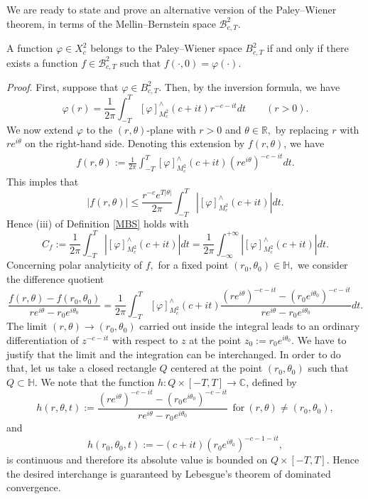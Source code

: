 \documentclass[amsmath,english,a4paper,graphicx,12pt]{article}
\begin{document}
We are ready to state and prove an alternative version of the Paley--Wiener theorem, in terms of the Mellin--Bernstein space $\mathscr{B}^2_{c,T}.$
\begin{Theorem}\label{pw2}
A function $\varphi \in X^2_c$ belongs to the Paley--Wiener space $B^2_{c,T}$ if and only if there exists a function $f\in \mathscr{B}^2_{c,T}$ such that 
$f(\cdot, 0) = \varphi(\cdot).$
\end{Theorem}
{\it Proof}. 
First, suppose that $\varphi \in B^2_{c,T}.$ Then, by the inversion formula,  we have
$$ \varphi (r) = \frac{1}{2\pi}\int_{-T}^T [\varphi]^\wedge_{M^2_c}(c+it) r^{-c-it}dt\qquad (r>0).$$
We now extend $\varphi$ to the $(r,\theta)$-plane with $r>0$ and $\theta \in \mathbb{R},$ by replacing $r$ with $re^{i\theta}$ on the right-hand side. 
Denoting  this extension by $f(r, \theta)$, we have
\begin{eqnarray}\label{rep}
f(r,\theta) := \frac{1}{2\pi}\int_{-T}^T [\varphi]^\wedge_{M^2_c}(c+it) (re^{i\theta})^{-c-it}dt.
\end{eqnarray}
This imples that 
$$|f(r,\theta)| \leq \frac{r^{-c}e^{T|\theta|}}{2\pi}  \int_{-T}^T |[\varphi]^\wedge_{M^2_c}(c+it) |dt.$$
Hence (iii) of Definition \ref{MBS} holds with 
$$C_f:= \frac{1}{2\pi}  \int_{-T}^T |[\varphi]^\wedge_{M^2_c}(c+it) |dt =
\frac{1}{2\pi}  \int_{-\infty}^{+\infty}|[\varphi]^\wedge_{M^2_c}(c+it) |dt.$$
Concerning polar analyticity of $f,$ for a fixed point $(r_0, \theta_0) \in \mathbb{H},$ we consider the difference quotient
$$\frac{f(r, \theta) - f(r_0, \theta_0)}{re^{i\theta} - r_0e^{i\theta_0}} =  \frac{1}{2\pi}  \int_{-T}^T [\varphi]^\wedge_{M^2_c}(c+it) 
\frac{(re^{i\theta})^{-c-it} - (r_0e^{i\theta_0})^{-c-it}}{re^{i\theta} - r_0e^{i\theta_0}}dt.$$
The limit $(r, \theta) \rightarrow (r_0, \theta_0)$ carried out inside the integral leads to an ordinary differentiation of $z^{-c-it}$ with respect 
to $z$ at the point $z_0:= r_0e^{i\theta_0}.$ We have to justify that the limit and the integration can be interchanged. In order to do that, 
let us take a closed rectangle $Q$ centered at the point $(r_0, \theta_0)$ such that $Q \subset \mathbb{H}.$ We note that the function $h:Q\times [-T,T] \rightarrow \mathbb{C}$, 
defined by
$$ h(r,\theta, t) := \frac{(re^{i\theta})^{-c-it} - (r_0e^{i\theta_0})^{-c-it}}{re^{i\theta} - r_0e^{i\theta_0}}~~\mbox{for}~(r,\theta) \neq (r_0, \theta_0),$$
and
$$ h(r_0,\theta_0,t):= -(c+it) (r_0e^{i\theta_0})^{-c-1-it},$$
is continuous and therefore its absolute value is bounded on $Q\times [-T,T].$ Hence the desired interchange is guaranteed by Lebesgue's theorem of
dominated convergence.
\end{document}
